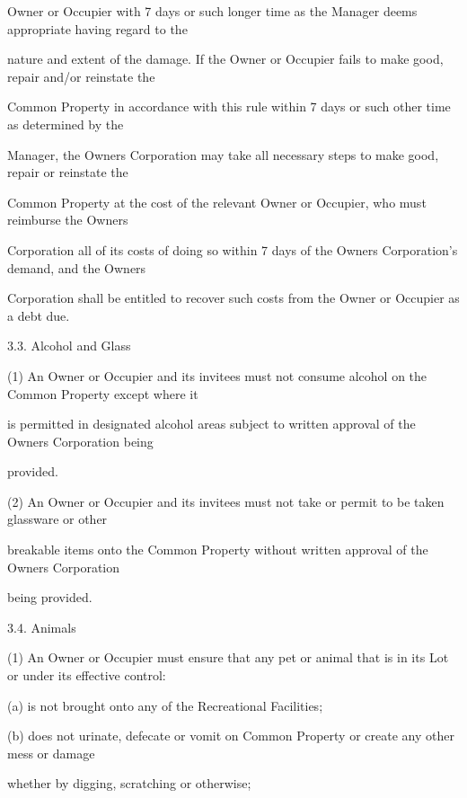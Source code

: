 \documentclass{article}
\begin{document}
{\fontsize{10.02}{1}Owner or Occupier with 7 days or such longer time as the Manager deems appropriate having regard to the }

{\fontsize{10.02}{1}nature and extent of the damage. If the Owner or Occupier fails to make good, repair and/or reinstate the }

{\fontsize{10.02}{1}Common Property in accordance with this rule within 7 days or such other time as determined by the }

{\fontsize{10.02}{1}Manager, the Owners Corporation may take all necessary steps to make good, repair or reinstate the }

{\fontsize{10.02}{1}Common Property at the cost of the relevant Owner or Occupier, who must reimburse the Owners }

{\fontsize{10.02}{1}Corporation all of its costs of doing so within 7 days of the Owners Corporation’s demand, and the Owners }

{\fontsize{10.02}{1}Corporation shall be entitled to recover such costs from the Owner or Occupier as a debt due. }

{\fontsize{9.99}{1}3.3. Alcohol and Glass }

{\fontsize{9.962}{1}(1) An Owner or Occupier and its invitees must not consume alcohol on the Common Property except where it }

{\fontsize{10.02}{1}is permitted in designated alcohol areas subject to written approval of the Owners Corporation being }

{\fontsize{10.02}{1}provided. }

{\fontsize{9.962}{1}(2) An Owner or Occupier and its invitees must not take or permit to be taken glassware or other }

{\fontsize{10.02}{1}breakable items onto the Common Property without written approval of the Owners Corporation }

{\fontsize{10.02}{1}being provided. }

{\fontsize{9.99}{1}3.4. Animals }

{\fontsize{9.962}{1}(1) An Owner or Occupier must ensure that any pet or animal that is in its Lot or under its effective control: }

{\fontsize{9.962}{1}(a) is not brought onto any of the Recreational Facilities; }

{\fontsize{9.962}{1}(b) does not urinate, defecate or vomit on Common Property or create any other mess or damage }

{\fontsize{10.02}{1}whether by digging, scratching or otherwise; }
\end{document}
